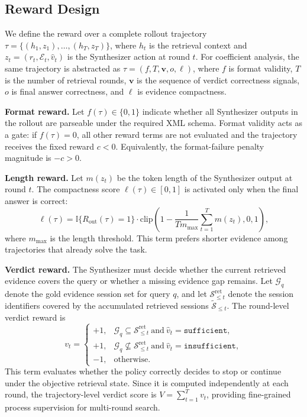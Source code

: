 \subsection{Reward Design}
\label{app:reward-design}

We define the reward over a complete rollout trajectory
$\tau=\{(h_1,z_1),\ldots,(h_T,z_T)\}$, where $h_t$ is the retrieval context and
$z_t=(r_t,\mathcal{E}_t,\hat{v}_t)$ is the Synthesizer action at round $t$. For
coefficient analysis, the same trajectory is abstracted as
$\tau=(f,T,\mathbf{v},o,\ell)$, where $f$ is format validity, $T$ is the number
of retrieval rounds, $\mathbf{v}$ is the sequence of verdict correctness
signals, $o$ is final answer correctness, and $\ell$ is evidence compactness.

\noindent\textbf{Format reward.}
Let $f(\tau)\in\{0,1\}$ indicate whether all Synthesizer outputs in the rollout
are parseable under the required XML schema. Format validity acts as a gate:
if $f(\tau)=0$, all other reward terms are not evaluated and the trajectory
receives the fixed reward $c<0$. Equivalently, the format-failure penalty
magnitude is $-c>0$.

\noindent\textbf{Length reward.}
Let $m(z_t)$ be the token length of the Synthesizer output at round $t$.
The compactness score $\ell(\tau)\in[0,1]$ is activated only when the final
answer is correct:
\[
\ell(\tau)
=
\mathbb{I}\{R_{\mathrm{out}}(\tau)=1\}
\cdot
\mathrm{clip}\!\left(
1-\frac{1}{Tm_{\max}}\sum_{t=1}^{T}m(z_t),
0,1
\right),
\]
where $m_{\max}$ is the length threshold. This term prefers shorter evidence
among trajectories that already solve the task.

\noindent\textbf{Verdict reward.}
The Synthesizer must decide whether the current retrieved evidence covers the
query or whether a missing evidence gap remains. Let $\mathcal{G}_q$ denote the
gold evidence session set for query $q$, and let
$\mathcal{S}^{\mathrm{ret}}_{\le t}$ denote the session identifiers covered by
the accumulated retrieved sessions $\widetilde{\mathcal{S}}_{\le t}$. The
round-level verdict reward is
\[
v_t=
\begin{cases}
+1, & \mathcal{G}_q\subseteq\mathcal{S}^{\mathrm{ret}}_{\le t}
\ \text{and}\ \hat{v}_t=\texttt{sufficient},\\
+1, & \mathcal{G}_q\not\subseteq\mathcal{S}^{\mathrm{ret}}_{\le t}
\ \text{and}\ \hat{v}_t=\texttt{insufficient},\\
-1, & \text{otherwise}.
\end{cases}
\]
This term evaluates whether the policy correctly decides to stop or continue
under the objective retrieval state. Since it is computed independently at each
round, the trajectory-level verdict score is $V=\sum_{t=1}^{T}v_t$, providing
fine-grained process supervision for multi-round search.

